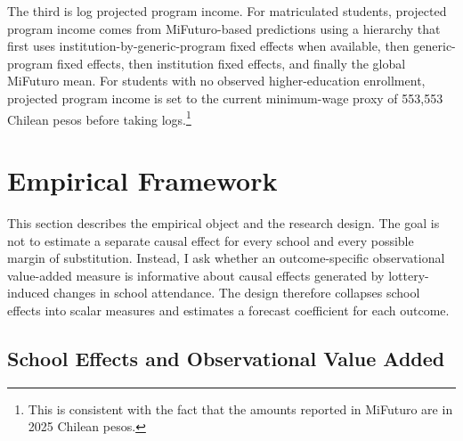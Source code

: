 \documentclass[a4paper, article, english, oneside, unknownkeysallowed, 12pt]{memoir}
\begin{document}
The third is log projected program income.
For matriculated students, projected program income comes from MiFuturo-based predictions using a hierarchy that first uses institution-by-generic-program fixed effects when available, then generic-program fixed effects, then institution fixed effects, and finally the global MiFuturo mean.
For students with no observed higher-education enrollment, projected program income is set to the current minimum-wage proxy of 553,553 Chilean pesos before taking logs.\footnote{This is consistent with the fact that the amounts reported in MiFuturo are in 2025 Chilean pesos.}



\clearpage 
\section{Empirical Framework}

This section describes the empirical object and the research design.
The goal is not to estimate a separate causal effect for every school and every possible margin of substitution.
Instead, I ask whether an outcome-specific observational value-added measure is informative about causal effects generated by lottery-induced changes in school attendance.
The design therefore collapses school effects into scalar measures and estimates a forecast coefficient for each outcome.

\subsection{School Effects and Observational Value Added}
\end{document}
